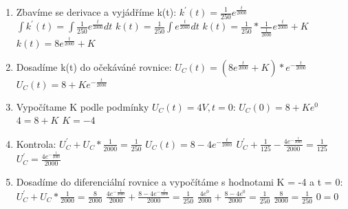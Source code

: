 \begin{enumerate}
    \item Zbavíme se derivace a vyjádříme k(t):\newline
    $k^{'}(t) = \frac{1}{250} e^{\frac{t}{2000}}$\newline
    $\int k^{'}(t) = \int \frac{1}{250} e^{\frac{t}{2000}}dt$\newline
    $ k(t) = \frac{1}{250} \int e^{\frac{t}{2000}}dt $\newline
    $ k(t) = \frac{1}{250} * \frac{1}{\frac{1}{2000}} e^{\frac{t}{2000}} + K$\newline
    $ k(t) = 8e^{\frac{t}{2000}} + K$\newline
    \item Dosadíme k(t) do očekáváné rovnice:\newline
    $U_C(t) = (8e^{\frac{t}{2000}} + K) * e^{-\frac{t}{2000}}$\newline
    $U_C(t) = 8 + Ke^{-\frac{t}{2000}}$\newline
    \item Vypočítame K podle podmínky ${U_C(t) = 4V}, t = 0$:\newline
    $U_C(0) = 8 + Ke^0$\newline
    $4 = 8 + K$\newline
    $K = -4$\newline
    \item Kontrola:\newline
    $U_{C}^{'} + U_C * \frac{1}{2000} = \frac{1}{250}$\newline
    $U_C(t) = 8 - 4e^{-\frac{t}{2000}}$\newline
    $U_{C}^{'} + \frac{1}{125} - \frac{4e^{-\frac{t}{2000}}}{2000} = \frac{1}{125}$\newline
    $U_{C}^{'} = \frac{4e^{-\frac{t}{2000}}}{2000}$\newline
    \item Dosadíme do diferenciální rovnice a vypočítáme s hodnotami K = -4  a t = 0:\newline
    $U_{C}^{'} + U_C * \frac{1}{2000} = \frac{8}{2000}$\newline
    $\frac{4e^{-\frac{t}{2000}}}{2000} + \frac{8 - 4e^{-\frac{t}{2000}}}{2000} = \frac{1}{250}$\newline
    $\frac{4e^0}{2000} + \frac{8 - 4e^0}{2000} = \frac{1}{250}$\newline
    $\frac{8}{2000} = \frac{1}{250}$\newline
    $0 = 0$
    
    
\end{enumerate}